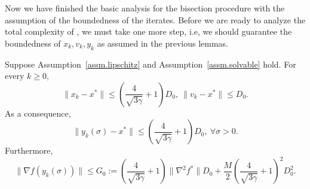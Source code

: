 \documentclass{mcom-l}
\numberwithin{equation}{section}
\begin{document}
Now we have finished the basic analysis for the bisection procedure with the assumption of the boundedness of the iterates. Before we are ready to analyze the total complexity of , we must take one more step, i.e, we should guarantee the boundedness of $x_k,v_k,y_k$ as assumed in the previous lemmas.
\begin{lemma}
    \label{lem.bounded iterate}
    Suppose Assumption~\ref{assm.lipschitz} and Assumption~\ref{assm.solvable} hold. For every $k\geq 0$,
    \begin{equation}
        \label{eq.bounded iterate}
        \|x_k- x^*\| \leq \left(\frac{4}{\sqrt{3\gamma}}+1\right)D_0, \ \|v_k-x^*\|\leq D_0.
    \end{equation}
    As a consequence,
    \begin{equation}
        \label{eq.bounded iterate y}
        \|y_k(\sigma)-x^*\| \leq \left(\frac{4}{\sqrt{3\gamma}}+1\right)D_0, \ \forall \sigma>0.
    \end{equation}
    Furthermore,
    \begin{equation}
        \label{eq.ub yk sigma}
        \|\nabla f(y_k(\sigma))\| \leq G_0:= \left(\frac{4}{\sqrt{3\gamma}}+1\right)\|\nabla ^2 f^*\|D_0+\frac{M}{2}\left(\frac{4}{\sqrt{3\gamma}}+1\right)^2 D_0^2.
    \end{equation}
\end{lemma}
\end{document}
